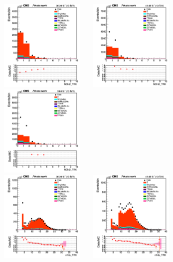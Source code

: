 \documentclass{cernatlasnote}
\begin{document}
   \begin{figure}[htp]
\centering
\includegraphics[width=4.6cm, height=4.4cm]{images/emu_channel/2016/16_Range_0pt2_1pt8/track_NChi2_TRK_Linear.png}
\includegraphics[width=4.6cm, height=4.4cm]{images/emu_channel/2017/17_Range_0pt2_1pt8/track_NChi2_TRK_Linear.png}
 \includegraphics[width=4.6cm, height=4.4cm]{images/emu_channel/2018/18_Range_0pt2_1pt8/track_NChi2_TRK_Linear.png}\\
 \includegraphics[width=4.6cm, height=4.4cm]{images/emu_channel/2016/16_Range_0pt2_1pt8/track_nhits_TRK_Linear.png}
\includegraphics[width=4.6cm, height=4.4cm]{images/emu_channel/2017/17_Range_0pt2_1pt8/track_nhits_TRK_Linear.png}

\end{figure}
\end{document}
